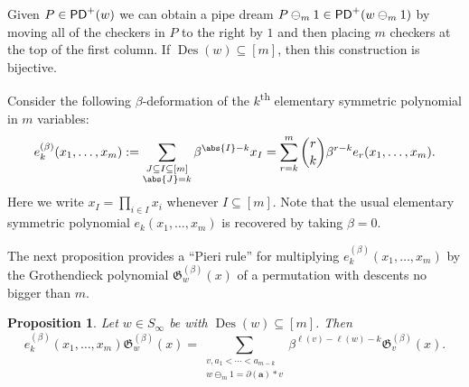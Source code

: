 \documentclass[11pt,reqno]{amsart} %
\newcommand{\frakG}{\mathfrak{G}}
\newcommand{\bfa}{\mathbf{a}}
\newcommand{\sseq}{\subseteq}
\DeclareMathOperator{\Des}{Des}
\DeclareMathOperator{\PD}{\sf{PD}}
\newtheorem{proposition}[theorem]{Proposition}
\theoremstyle{definition}
\begin{document}
Given $P\in \PD^+(w)$ we can obtain a pipe dream $P\ominus_m 1\in \PD^+(w\ominus_m 1)$ by moving all of the checkers in $P$ to the right by $1$ and then placing $m$ checkers at the top of the first column.
If $\Des(w)\sseq [m]$, then this construction is bijective.

Consider the following $\beta$-deformation of the $k$\textsuperscript{th} elementary symmetric polynomial in $m$ variables: \[
    e_k^{(\beta)}(x_1,\dots,x_m)
    := \sum_{\substack{J\sseq I\sseq[m] \\ \abs{J} = k}}
    \beta^{\abs{I}-k} x_I
    = \sum_{r=k}^m \binom{r}{k} \beta^{r-k} e_r(x_1,\dots,x_m).
\]
Here we write $x_I = \prod_{i\in I} x_i$ whenever $I\sseq [m]$.
Note that the usual elementary symmetric polynomial $e_k(x_1,\dots,x_m)$ is recovered by taking $\beta = 0$.

The next proposition provides a ``Pieri rule'' for multiplying $e_k^{(\beta)}(x_1,\dots,x_m)$ by the Grothendieck polynomial $\frakG^{(\beta)}_w(x)$ of a permutation with descents no bigger than $m$.

\begin{proposition}
\label{prop:K-pieri rule}
Let $w\in S_\infty$ be with $\Des(w)\sseq [m]$.
Then \[
    e_k^{(\beta)}(x_1,\dots,x_m) \frakG_w^{(\beta)}(x)
    = \sum_{\substack{
        v, a_1 < \cdots < a_{m-k} \\
        w\ominus_m 1 = \partial(\bfa) * v
    }}
    \beta^{\ell(v)-\ell(w)-k} \frakG_v^{(\beta)}(x).
\]
\end{proposition}
\end{document}
